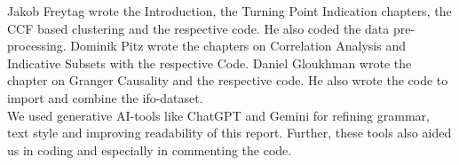 
Jakob Freytag wrote the Introduction, the Turning Point Indication chapters, the CCF based clustering and the respective code. He also coded the data pre-processing.
Dominik Pitz wrote the chapters on Correlation Analysis and Indicative Subsets with the respective Code.
Daniel Gloukhman wrote the chapter on Granger Causality and the respective code. He also wrote the code to import and combine the ifo-dataset.\\
We used generative AI-tools like ChatGPT and Gemini for refining grammar, text style and improving readability of this report. Further, these tools also aided us in coding and especially in commenting the code. 